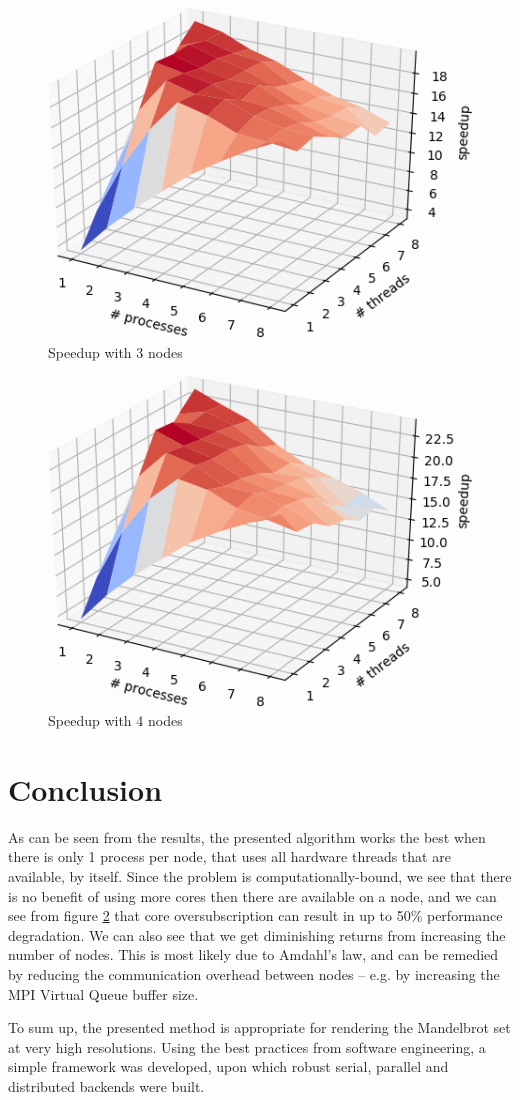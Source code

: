 \documentclass[a4paper]{article}
\begin{document}
	\begin{figure}
		\centering
		\includegraphics[width=0.8\linewidth]{3node.png}
		\caption{Speedup with 3 nodes}
		\label{fig: 3 node speedup}
	\end{figure}

	\begin{figure}
		\centering
		\includegraphics[width=0.8\linewidth]{4node.png}
		\caption{Speedup with 4 nodes}
		\label{fig: 4 node speedup}
	\end{figure}
	
	\section{Conclusion}
	As can be seen from the results, the presented algorithm works the best when there is only 1 process per node, that uses all hardware threads that are available, by itself. Since the problem is computationally-bound, we see that there is no benefit of using more cores then there are available on a node, and we can see from figure \ref{fig: 4 node speedup} that core oversubscription can result in up to 50\% performance degradation. We can also see that we get diminishing returns from increasing the number of nodes. This is most likely due to Amdahl's law, and can be remedied by reducing the communication overhead between nodes -- e.g. by increasing the MPI Virtual Queue buffer size.
	
	To sum up, the presented method is appropriate for rendering the Mandelbrot set at very high resolutions. Using the best practices from software engineering, a simple framework was developed, upon which robust serial, parallel and distributed backends were built.
	
\end{document}
